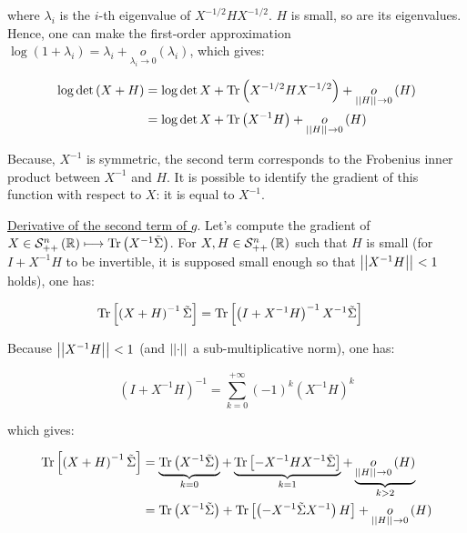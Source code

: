 \documentclass[a4paper, 11pt]{article}
\begin{document}
\begin{enumerate}[label=\alph*]
    where $\lambda_{i}$ is the $i$-th eigenvalue of $X^{-1/2}HX^{-1/2}$. $H$ is small, so are its eigenvalues. Hence, one can make the first-order approximation $\log \left( 1 + \lambda_{i} \right) = \lambda_{i} + \underset{\lambda_{i} \rightarrow 0}{o} \left( \lambda_{i} \right)$, which gives:
    
    \begin{equation*}
        \begin{aligned}
        \log \det \left( X + H \right) &= \log \det X + \operatorname{Tr} \left( X^{-1/2}HX^{-1/2} \right) + \underset{\left|\left| H \right|\right|_{} \rightarrow 0}{o} \left( H \right) \\
        &= \log \det X + \operatorname{Tr} \left( X^{-1} H \right) + \underset{\left|\left| H \right|\right|_{} \rightarrow 0}{o} \left( H \right)
        \end{aligned}
    \end{equation*}
    
    Because, $X^{-1}$ is symmetric, the second term corresponds to the Frobenius inner product between $X^{-1}$ and $H$. It is possible to identify the gradient of this function with respect to $X$: it is equal to $X^{-1}$.
    
    \underline{Derivative of the second term of $g$}. Let's compute the gradient of $X \in \mathcal{S}_{++}^{n} \left( \mathbb{R} \right) \longmapsto \operatorname{Tr} \left( X^{-1} \Tilde{\Sigma} \right)$. For $X, H \in \mathcal{S}_{++}^{n} \left( \mathbb{R} \right)$ such that $H$ is small (for $I + X^{-1}H$ to be invertible, it is supposed small enough so that $\left|\left| X^{-1}H \right|\right|_{} < 1$ holds), one has:
    
    \begin{equation*}
        \begin{aligned}
        \operatorname{Tr} \left[ \left( X + H \right)^{-1} \Tilde{\Sigma} \right] &= \operatorname{Tr} \left[ \left( I + X^{-1}H \right)^{-1} X^{-1} \Tilde{\Sigma} \right]
        \end{aligned}
    \end{equation*}
    
    Because $\left|\left| X^{-1}H \right|\right|_{} < 1$ (and $\left|\left| \cdot \right|\right|_{}$ a sub-multiplicative norm), one has:
    
    \begin{equation*}
        \left( I + X^{-1}H \right)^{-1} = \sum_{k=0}^{+ \infty} \left( -1 \right)^{k} \left( X^{-1}H \right)^{k}
    \end{equation*}
    
    which gives:
    
    \begin{equation*}
        \begin{aligned}
        \operatorname{Tr} \left[ \left( X + H \right)^{-1} \Tilde{\Sigma} \right] &= \underbrace{\operatorname{Tr} \left( X^{-1}\Tilde{\Sigma} \right)}_{k=0} + \underbrace{\operatorname{Tr} \left[ - X^{-1}HX^{-1} \Tilde{\Sigma} \right]}_{k=1} + \underbrace{\underset{\left|\left| H \right|\right|_{} \rightarrow 0}{o} \left( H \right)}_{k > 2} \\
        &= \operatorname{Tr} \left( X^{-1}\Tilde{\Sigma} \right) + \operatorname{Tr} \left[ \left( - X^{-1}\Tilde{\Sigma}X^{-1} \right) H \right] + \underset{\left|\left| H \right|\right|_{} \rightarrow 0}{o} \left( H \right)
        \end{aligned}
    \end{equation*}
    

\end{enumerate}
\end{document}
